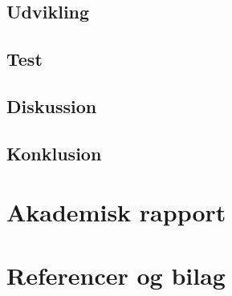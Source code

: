 \chapter{Udvikling}
\label{chap:development}









\chapter{Test} 
\label{chap:testing}


\chapter{Diskussion}
\label{chap:Discussion}



\chapter{Konklusion}
\label{chap:conclusion}


\part{Akademisk rapport}





\part{Referencer og bilag}
\begingroup
	\raggedright
	{}	%
\endgroup


\newpage
\listoffixmes	%

\clearforchapter

\appendix	%







